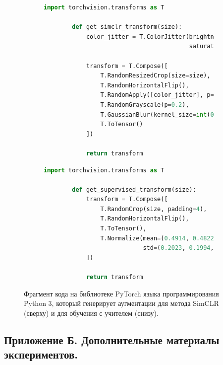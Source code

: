 \begin{figure}[H]
    \centering
    \renewcommand{\thefigure}{А.1}
    \begin{subfigure}[b]{0.8\textwidth}
        \centering
        \begin{lstlisting}[language=Python]
        import torchvision.transforms as T
        
        def get_simclr_transform(size):
            color_jitter = T.ColorJitter(brightness=0.8, contrast=0.8,
                                         saturation=0.8, hue=0.2)
            
            transform = T.Compose([
                T.RandomResizedCrop(size=size),
                T.RandomHorizontalFlip(),
                T.RandomApply([color_jitter], p=0.8),
                T.RandomGrayscale(p=0.2),
                T.GaussianBlur(kernel_size=int(0.1 * size)),
                T.ToTensor()
            ])
            
            return transform
        \end{lstlisting}
    \end{subfigure}
    \begin{subfigure}[b]{0.8\textwidth}
        \centering
        \begin{lstlisting}[language=Python]
        import torchvision.transforms as T
        
        def get_supervised_transform(size):
            transform = T.Compose([
                T.RandomCrop(size, padding=4),
                T.RandomHorizontalFlip(),
                T.ToTensor(),
                T.Normalize(mean=(0.4914, 0.4822, 0.4465),
                            std=(0.2023, 0.1994, 0.2010))
            ])
            
            return transform
        \end{lstlisting}
    \end{subfigure}
    \caption{Фрагмент кода на библиотеке PyTorch языка программирования Python 3, который генерирует аугментации для метода SimCLR (сверху) и для обучения с учителем (снизу).}
    \label{appendix:pic:1}
\end{figure}{}

\subsection*{Приложение Б. Дополнительные материалы экспериментов.} 
\label{appendix:2}

